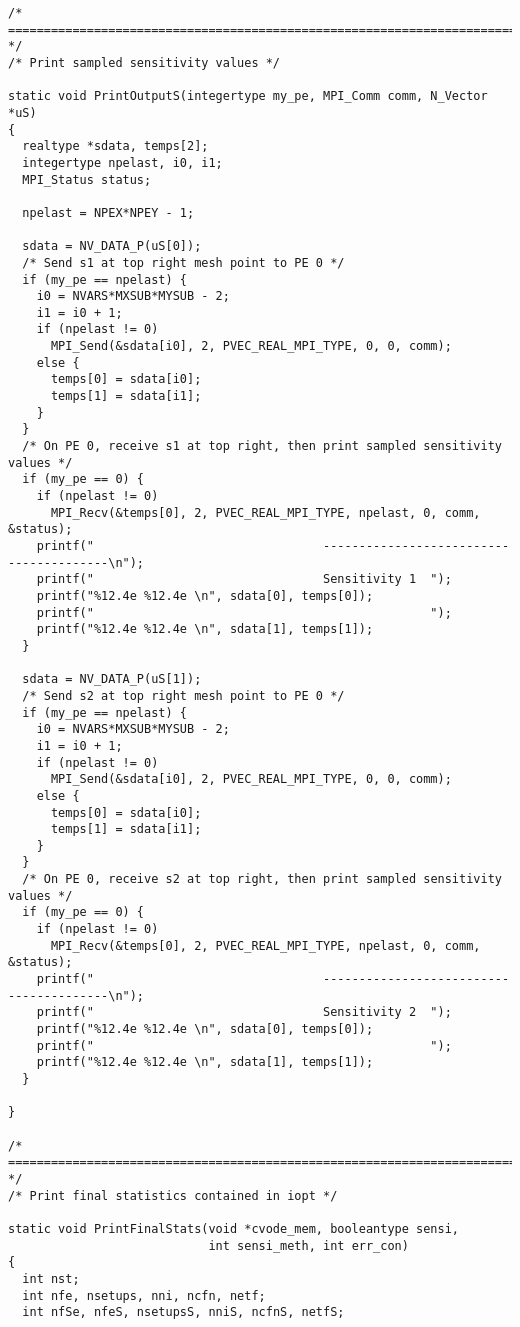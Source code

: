 \begin{verbatim}
/* ======================================================================= */
/* Print sampled sensitivity values */

static void PrintOutputS(integertype my_pe, MPI_Comm comm, N_Vector *uS)
{
  realtype *sdata, temps[2];
  integertype npelast, i0, i1;
  MPI_Status status;

  npelast = NPEX*NPEY - 1;

  sdata = NV_DATA_P(uS[0]);
  /* Send s1 at top right mesh point to PE 0 */
  if (my_pe == npelast) {
    i0 = NVARS*MXSUB*MYSUB - 2;
    i1 = i0 + 1;
    if (npelast != 0)
      MPI_Send(&sdata[i0], 2, PVEC_REAL_MPI_TYPE, 0, 0, comm);
    else {
      temps[0] = sdata[i0];
      temps[1] = sdata[i1];
    }
  }
  /* On PE 0, receive s1 at top right, then print sampled sensitivity values */ 
  if (my_pe == 0) {
    if (npelast != 0)
      MPI_Recv(&temps[0], 2, PVEC_REAL_MPI_TYPE, npelast, 0, comm, &status);
    printf("                                ----------------------------------------\n");
    printf("                                Sensitivity 1  ");
    printf("%12.4e %12.4e \n", sdata[0], temps[0]); 
    printf("                                               ");
    printf("%12.4e %12.4e \n", sdata[1], temps[1]);
  }

  sdata = NV_DATA_P(uS[1]);
  /* Send s2 at top right mesh point to PE 0 */
  if (my_pe == npelast) {
    i0 = NVARS*MXSUB*MYSUB - 2;
    i1 = i0 + 1;
    if (npelast != 0)
      MPI_Send(&sdata[i0], 2, PVEC_REAL_MPI_TYPE, 0, 0, comm);
    else {
      temps[0] = sdata[i0];
      temps[1] = sdata[i1];
    }
  }
  /* On PE 0, receive s2 at top right, then print sampled sensitivity values */ 
  if (my_pe == 0) {
    if (npelast != 0)
      MPI_Recv(&temps[0], 2, PVEC_REAL_MPI_TYPE, npelast, 0, comm, &status);
    printf("                                ----------------------------------------\n");
    printf("                                Sensitivity 2  ");
    printf("%12.4e %12.4e \n", sdata[0], temps[0]); 
    printf("                                               ");
    printf("%12.4e %12.4e \n", sdata[1], temps[1]);
  }

}

/* ======================================================================= */
/* Print final statistics contained in iopt */

static void PrintFinalStats(void *cvode_mem, booleantype sensi, 
                            int sensi_meth, int err_con)
{
  int nst;
  int nfe, nsetups, nni, ncfn, netf;
  int nfSe, nfeS, nsetupsS, nniS, ncfnS, netfS;


\end{verbatim}
